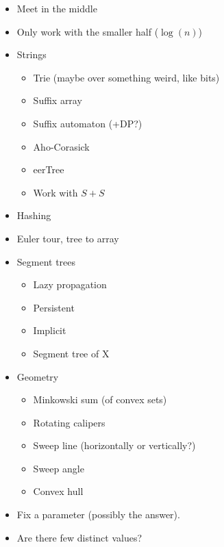 \documentclass[8pt,a4paper,landscape,oneside]{amsart}
\newenvironment{myitemize}
{ \begin{itemize}[leftmargin=.5cm]
    \setlength{\itemsep}{0pt}
    \setlength{\parskip}{0pt}
    \setlength{\parsep}{0pt}     }
{ \end{itemize}                  }
\begin{document}
\begin{multicols*}{3}
\begin{myitemize}
\begin{itemize}
                    \end{itemize}
                \item Meet in the middle
                \item Only work with the smaller half ($\log(n)$)
                \item Strings
                    \begin{itemize}
                        \item Trie (maybe over something weird, like bits)
                        \item Suffix array
                        \item Suffix automaton (+DP?)
                        \item Aho-Corasick
                        \item eerTree
                        \item Work with $S+S$
                    \end{itemize}
                \item Hashing
                \item Euler tour, tree to array
                \item Segment trees
                    \begin{itemize}
                        \item Lazy propagation
                        \item Persistent
                        \item Implicit
                        \item Segment tree of X
                    \end{itemize}
                \item Geometry
                    \begin{itemize}
                        \item Minkowski sum (of convex sets)
                        \item Rotating calipers
                        \item Sweep line (horizontally or vertically?)
                        \item Sweep angle
                        \item Convex hull
                    \end{itemize}
                \item Fix a parameter (possibly the answer).
                \item Are there few distinct values?

\end{myitemize}
\end{multicols*}
\end{document}
